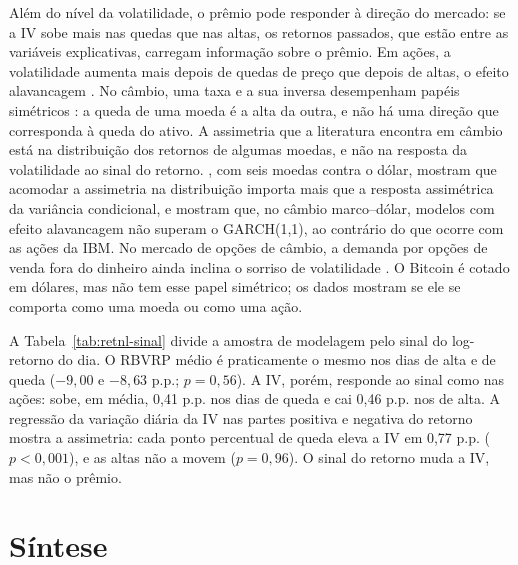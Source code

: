 Além do nível da volatilidade, o prêmio pode responder à direção do mercado:
se a IV sobe mais nas quedas que nas altas, os retornos passados, que estão
entre as variáveis explicativas, carregam informação sobre o prêmio.
Em ações, a volatilidade aumenta mais depois de quedas de preço que depois de
altas, o efeito alavancagem \citep{black1976studies, christie1982stochastic}.
No câmbio, uma taxa e a sua inversa desempenham papéis simétricos
\citep{alexander2006normal}: a queda de uma moeda é a alta da outra, e não há
uma direção que corresponda à queda do ativo. A assimetria que a literatura
encontra em câmbio está na distribuição dos retornos de algumas moedas, e não
na resposta da volatilidade ao sinal do retorno. \citet{wang2001flexible}, com
seis moedas contra o dólar, mostram que acomodar a assimetria na distribuição
importa mais que a resposta assimétrica da variância condicional, e
\citet{hansen2005forecast} mostram que, no câmbio marco--dólar, modelos com
efeito alavancagem não superam o GARCH(1,1), ao contrário do que ocorre com as
ações da IBM. No mercado de opções de câmbio, a demanda por opções de venda
fora do dinheiro ainda inclina o sorriso de volatilidade
\citep{alexander2006normal}. O Bitcoin é cotado em dólares, mas não tem esse
papel simétrico; os dados mostram se ele se comporta como uma moeda ou como uma
ação.

A Tabela~\ref{tab:retnl-sinal} divide a amostra de modelagem pelo sinal do
log-retorno do dia. O RBVRP médio é praticamente o mesmo nos dias de alta e de
queda ($-9{,}00$ e $-8{,}63$ p.p.; $p = 0{,}56$). A IV, porém, responde ao
sinal como nas ações: sobe, em média, 0,41 p.p. nos dias de queda e cai 0,46
p.p. nos de alta. A regressão da variação diária da IV nas partes positiva e
negativa do retorno mostra a assimetria: cada ponto percentual de queda eleva a
IV em 0,77 p.p. ($p < 0{,}001$), e as altas não a movem ($p = 0{,}96$). O sinal
do retorno muda a IV, mas não o prêmio.



\section{Síntese}
\label{sec:retnl-sintese}

